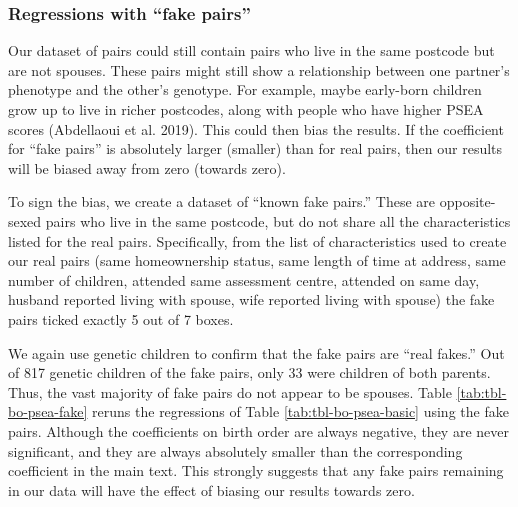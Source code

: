 \documentclass[
]{article}
\begin{document}
\FloatBarrier

\newpage

\hypertarget{regressions-with-fake-pairs}{%
\subsubsection{Regressions with ``fake pairs''}\label{regressions-with-fake-pairs}}

Our dataset of pairs could still contain pairs who live in the same
postcode but are not spouses. These pairs might still show a
relationship between one partner's phenotype and the other's genotype.
For example, maybe early-born children grow up to live in richer
postcodes, along with people who have higher PSEA scores
(Abdellaoui et al. 2019). This could then bias the results. If the
coefficient for ``fake pairs'' is absolutely larger (smaller) than for
real pairs, then our results will be biased away from zero (towards
zero).

To sign the bias, we create a dataset of ``known fake pairs.'' These are
opposite-sexed pairs who live in the same postcode, but do not share all
the characteristics listed for the real pairs. Specifically, from the
list of characteristics used to create our real pairs (same
homeownership status, same length of time at address, same number of
children, attended same assessment centre, attended on same day, husband
reported living with spouse, wife reported living with spouse) the fake
pairs ticked exactly 5 out of 7 boxes.

We again use genetic children to confirm that the fake pairs are ``real
fakes.'' Out of 817 genetic children of the fake pairs, only
33 were children of both parents. Thus, the vast majority of
fake pairs do not appear to be spouses. Table
\ref{tab:tbl-bo-psea-fake} reruns the regressions of Table
\ref{tab:tbl-bo-psea-basic} using the fake pairs. Although the
coefficients on birth order are always negative, they are never
significant, and they are always absolutely smaller than the
corresponding coefficient in the main text. This strongly suggests that
any fake pairs remaining in our data will have the effect of biasing our
results towards zero.

 
  \providecommand{\huxb}[2]{\arrayrulecolor[RGB]{#1}\global\arrayrulewidth=#2pt}
  \providecommand{\huxvb}[2]{\color[RGB]{#1}\vrule width #2pt}
  \providecommand{\huxtpad}[1]{\rule{0pt}{#1}}
  \providecommand{\huxbpad}[1]{\rule[-#1]{0pt}{#1}}
\end{document}
